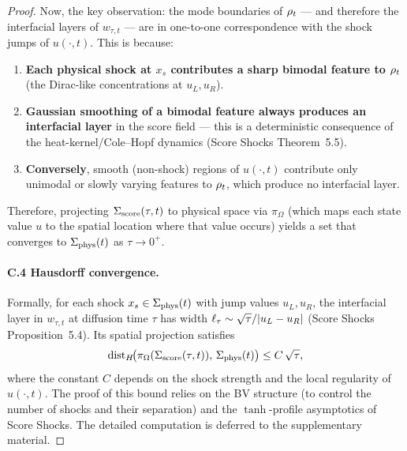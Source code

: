 \begin{proof}
Now, the key observation: the mode boundaries of $\rho_{t}$ --- and therefore the interfacial layers of $w_{\tau, t}$ --- are in one-to-one correspondence with the shock jumps of $u(\cdot, t)$. This is because:
\begin{enumerate}
\item[1.] \textbf{Each physical shock at $x_{s}$ contributes a sharp bimodal feature to $\rho_{t}$} (the Dirac-like concentrations at $u_{L}, u_{R}$).
\item[2.] \textbf{Gaussian smoothing of a bimodal feature always produces an interfacial layer} in the score field --- this is a deterministic consequence of the heat-kernel/Cole--Hopf dynamics (Score Shocks Theorem~5.5).
\item[3.] \textbf{Conversely}, smooth (non-shock) regions of $u(\cdot, t)$ contribute only unimodal or slowly varying features to $\rho_{t}$, which produce no interfacial layer.
\end{enumerate}

Therefore, projecting $\Sigma_{\mathrm{score}}(\tau, t)$ to physical space via $\pi_{\Omega}$ (which maps each state value $u$ to the spatial location where that value occurs) yields a set that converges to $\Sigma_{\mathrm{phys}}(t)$ as $\tau \to 0^{+}$.

\paragraph{C.4 Hausdorff convergence.}
Formally, for each shock $x_{s} \in \Sigma_{\mathrm{phys}}(t)$ with jump values $u_{L}, u_{R}$, the interfacial layer in $w_{\tau, t}$ at diffusion time $\tau$ has width $\ell_{\tau} \sim \sqrt{\tau} / \lvert u_{L} - u_{R} \rvert$ (Score Shocks Proposition~5.4). Its spatial projection satisfies
\begin{equation}
\mathrm{dist}_{H}\!\bigl(\pi_{\Omega}(\Sigma_{\mathrm{score}}(\tau, t)), \, \Sigma_{\mathrm{phys}}(t)\bigr) \le C \, \sqrt{\tau},
\label{eq:thm1-C4-bound}
\end{equation}
where the constant $C$ depends on the shock strength and the local regularity of $u(\cdot, t)$. The proof of this bound relies on the BV structure (to control the number of shocks and their separation) and the $\tanh$-profile asymptotics of Score Shocks. The detailed computation is deferred to the supplementary material.
\end{proof}

